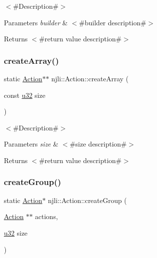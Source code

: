 $<$\#\+Description\#$>$


\begin{DoxyParams}{Parameters}
{\em builder} & $<$\#builder description\#$>$\\
\hline
\end{DoxyParams}
\begin{DoxyReturn}{Returns}
$<$\#return value description\#$>$ 
\end{DoxyReturn}
\mbox{\label{classnjli_1_1_action_a8f74322c9c8a1c256a423886feee255e}} 
\subsubsection{\texorpdfstring{create\+Array()}{createArray()}}
{\footnotesize\ttfamily static \mbox{\hyperlink{classnjli_1_1_action}{Action}}$\ast$$\ast$ njli\+::\+Action\+::create\+Array (\begin{DoxyParamCaption}\item[{const \mbox{\hyperlink{_util_8h_a10e94b422ef0c20dcdec20d31a1f5049}{u32}}}]{size }\end{DoxyParamCaption})\hspace{0.3cm}{\ttfamily [static]}}

$<$\#\+Description\#$>$


\begin{DoxyParams}{Parameters}
{\em size} & $<$\#size description\#$>$\\
\hline
\end{DoxyParams}
\begin{DoxyReturn}{Returns}
$<$\#return value description\#$>$ 
\end{DoxyReturn}
\mbox{\label{classnjli_1_1_action_ac4ab7217919a1c0a7858854aa1e18b6d}} 
\subsubsection{\texorpdfstring{create\+Group()}{createGroup()}}
{\footnotesize\ttfamily static \mbox{\hyperlink{classnjli_1_1_action}{Action}}$\ast$ njli\+::\+Action\+::create\+Group (\begin{DoxyParamCaption}\item[{\mbox{\hyperlink{classnjli_1_1_action}{Action}} $\ast$$\ast$}]{actions,  }\item[{\mbox{\hyperlink{_util_8h_a10e94b422ef0c20dcdec20d31a1f5049}{u32}}}]{size }\end{DoxyParamCaption})\hspace{0.3cm}{\ttfamily [static]}}

